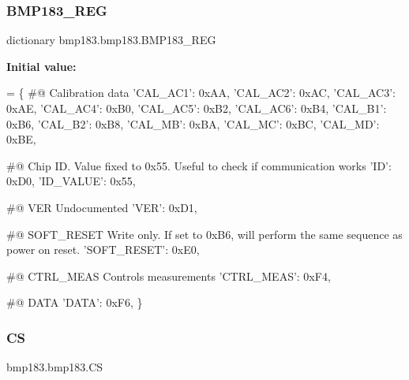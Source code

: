 \subsubsection{\texorpdfstring{B\+M\+P183\+\_\+\+R\+EG}{BMP183\_REG}}
{\footnotesize\ttfamily dictionary bmp183.\+bmp183.\+B\+M\+P183\+\_\+\+R\+EG\hspace{0.3cm}{\ttfamily [static]}}

{\bfseries Initial value\+:}
\begin{DoxyCode}
=  \{
        \textcolor{comment}{#@ Calibration data}
        \textcolor{stringliteral}{'CAL\_AC1'}: 0xAA,
        \textcolor{stringliteral}{'CAL\_AC2'}: 0xAC,
        \textcolor{stringliteral}{'CAL\_AC3'}: 0xAE,
        \textcolor{stringliteral}{'CAL\_AC4'}: 0xB0,
        \textcolor{stringliteral}{'CAL\_AC5'}: 0xB2,
        \textcolor{stringliteral}{'CAL\_AC6'}: 0xB4,
        \textcolor{stringliteral}{'CAL\_B1'}: 0xB6,
        \textcolor{stringliteral}{'CAL\_B2'}: 0xB8,
        \textcolor{stringliteral}{'CAL\_MB'}: 0xBA,
        \textcolor{stringliteral}{'CAL\_MC'}: 0xBC,
        \textcolor{stringliteral}{'CAL\_MD'}: 0xBE,

        \textcolor{comment}{#@ Chip ID. Value fixed to 0x55. Useful to check if communication works}
        \textcolor{stringliteral}{'ID'}: 0xD0,
        \textcolor{stringliteral}{'ID\_VALUE'}: 0x55,

        \textcolor{comment}{#@ VER Undocumented}
        \textcolor{stringliteral}{'VER'}: 0xD1,

        \textcolor{comment}{#@ SOFT\_RESET Write only. If set to 0xB6, will perform the same sequence as power on reset.}
        \textcolor{stringliteral}{'SOFT\_RESET'}: 0xE0,

        \textcolor{comment}{#@ CTRL\_MEAS Controls measurements}
        \textcolor{stringliteral}{'CTRL\_MEAS'}: 0xF4,

        \textcolor{comment}{#@ DATA}
        \textcolor{stringliteral}{'DATA'}: 0xF6,
    \}
\end{DoxyCode}
\mbox{\label{classbmp183_1_1bmp183_a359725ee2f7c74747e696f9798edb73a}} 
\subsubsection{\texorpdfstring{CS}{CS}}
{\footnotesize\ttfamily bmp183.\+bmp183.\+CS}


